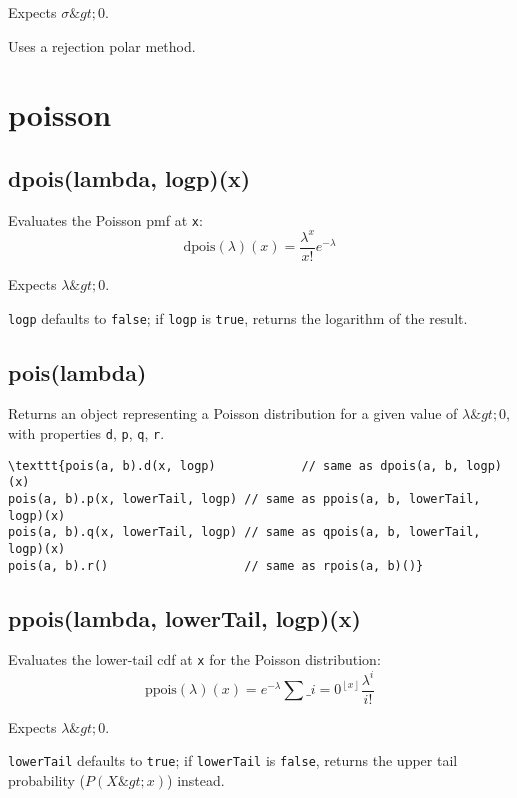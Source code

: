 \documentclass{article}
\begin{document}
Expects $\sigma \&gt; 0$.


Uses a rejection polar method.


  \section{poisson}
    \subsection*{dpois(lambda, logp)(x)}
    Evaluates the Poisson pmf at \texttt{x}:
$$\textrm{dpois}(\lambda)(x) = \frac{\lambda^x}{x!}e^{-\lambda}$$


Expects $\lambda \&gt; 0$.


\texttt{logp} defaults to \texttt{false}; if \texttt{logp} is \texttt{true}, returns the
logarithm of the result.


    \subsection*{pois(lambda)}
    Returns an object representing a Poisson distribution
for a given value of $\lambda \&gt; 0$, with properties \texttt{d}, \texttt{p}, \texttt{q}, \texttt{r}.


\begin{lstlisting}
\texttt{pois(a, b).d(x, logp)            // same as dpois(a, b, logp)(x)
pois(a, b).p(x, lowerTail, logp) // same as ppois(a, b, lowerTail, logp)(x)
pois(a, b).q(x, lowerTail, logp) // same as qpois(a, b, lowerTail, logp)(x)
pois(a, b).r()                   // same as rpois(a, b)()}\end{lstlisting}

    \subsection*{ppois(lambda, lowerTail, logp)(x)}
    Evaluates the lower-tail cdf at \texttt{x} for the Poisson distribution:
$$\textrm{ppois}(\lambda)(x) = e^{-\lambda} \sum\_{i=0}^{\left \lfloor{x}\right \rfloor}\frac{\lambda^i}{i!}$$


Expects $\lambda \&gt; 0$.


\texttt{lowerTail} defaults to \texttt{true}; if \texttt{lowerTail} is \texttt{false}, returns
the upper tail probability ($P(X \&gt; x)$) instead.
\end{document}
